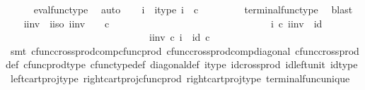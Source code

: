 \begin{isabellebody}
\ \ \ \ \isamarkupfalse%
\ eval{\isacharunderscore}{\kern0pt}func{\isacharunderscore}{\kern0pt}type\ \isamarkupfalse%
\ auto\isanewline
\ \ \isamarkupfalse%
\ i\ \ i{\isacharunderscore}{\kern0pt}type{\isacharcolon}{\kern0pt}\ {\isachardoublequoteopen}i{\isacharcolon}{\kern0pt}\ {\isasymone}\ {\isasymtimes}\isactrlsub c\ {\isasymone}\ {\isasymrightarrow}\ {\isasymone}{\isachardoublequoteclose}\isanewline
\ \ \ \ \isamarkupfalse%
\ terminal{\isacharunderscore}{\kern0pt}func{\isacharunderscore}{\kern0pt}type\ \isamarkupfalse%
\ blast\isanewline
\ \ \isamarkupfalse%
\ i{\isacharunderscore}{\kern0pt}inv\ \ i{\isacharunderscore}{\kern0pt}iso{\isacharcolon}{\kern0pt}\ {\isachardoublequoteopen}i{\isacharunderscore}{\kern0pt}inv{\isacharcolon}{\kern0pt}\ {\isasymone}{\isasymrightarrow}\ \ {\isasymone}\ {\isasymtimes}\isactrlsub c\ {\isasymone}\ {\isasymand}\ \isanewline
\ \ \ \ \ \ \ \ \ \ \ \ \ \ \ \ \ \ \ \ \ \ \ \ \ \ \ \ \ i\ {\isasymcirc}\isactrlsub c\ i{\isacharunderscore}{\kern0pt}inv\ {\isacharequal}{\kern0pt}\ id{\isacharparenleft}{\kern0pt}{\isasymone}{\isacharparenright}{\kern0pt}\ {\isasymand}\ \ \isanewline
\ \ \ \ \ \ \ \ \ \ \ \ \ \ \ \ \ \ \ \ \ \ \ \ \ \ \ \ \ i{\isacharunderscore}{\kern0pt}inv\ {\isasymcirc}\isactrlsub c\ i\ {\isacharequal}{\kern0pt}\ id{\isacharparenleft}{\kern0pt}{\isasymone}\ {\isasymtimes}\isactrlsub c\ {\isasymone}{\isacharparenright}{\kern0pt}{\isachardoublequoteclose}\isanewline
\ \ \ \ \isamarkupfalse%
\ {\isacharparenleft}{\kern0pt}smt\ cfunc{\isacharunderscore}{\kern0pt}cross{\isacharunderscore}{\kern0pt}prod{\isacharunderscore}{\kern0pt}comp{\isacharunderscore}{\kern0pt}cfunc{\isacharunderscore}{\kern0pt}prod\ cfunc{\isacharunderscore}{\kern0pt}cross{\isacharunderscore}{\kern0pt}prod{\isacharunderscore}{\kern0pt}comp{\isacharunderscore}{\kern0pt}diagonal\ cfunc{\isacharunderscore}{\kern0pt}cross{\isacharunderscore}{\kern0pt}prod{\isacharunderscore}{\kern0pt}def\ cfunc{\isacharunderscore}{\kern0pt}prod{\isacharunderscore}{\kern0pt}type\ cfunc{\isacharunderscore}{\kern0pt}type{\isacharunderscore}{\kern0pt}def\ diagonal{\isacharunderscore}{\kern0pt}def\ i{\isacharunderscore}{\kern0pt}type\ id{\isacharunderscore}{\kern0pt}cross{\isacharunderscore}{\kern0pt}prod\ id{\isacharunderscore}{\kern0pt}left{\isacharunderscore}{\kern0pt}unit\ id{\isacharunderscore}{\kern0pt}type\ left{\isacharunderscore}{\kern0pt}cart{\isacharunderscore}{\kern0pt}proj{\isacharunderscore}{\kern0pt}type\ right{\isacharunderscore}{\kern0pt}cart{\isacharunderscore}{\kern0pt}proj{\isacharunderscore}{\kern0pt}cfunc{\isacharunderscore}{\kern0pt}prod\ right{\isacharunderscore}{\kern0pt}cart{\isacharunderscore}{\kern0pt}proj{\isacharunderscore}{\kern0pt}type\ terminal{\isacharunderscore}{\kern0pt}func{\isacharunderscore}{\kern0pt}unique{\isacharparenright}{\kern0pt}\isanewline

\end{isabellebody}
